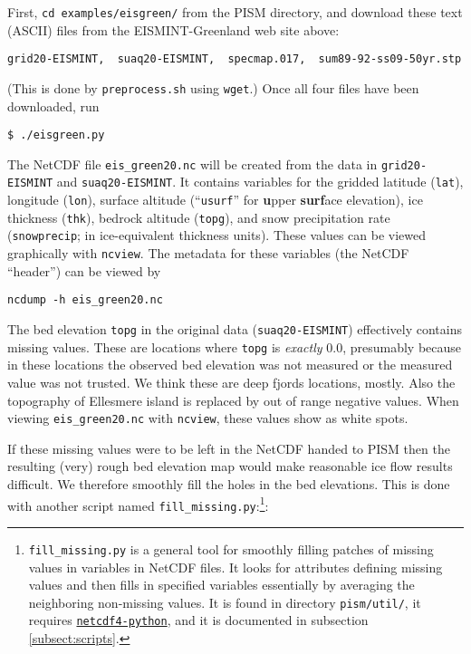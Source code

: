 First, \texttt{cd examples/eisgreen/} from the PISM directory, and download these text (ASCII) files from the EISMINT-Greenland web site above: 

\begin{verbatim}
grid20-EISMINT,  suaq20-EISMINT,  specmap.017,  sum89-92-ss09-50yr.stp
\end{verbatim}

\noindent (This is done by \texttt{preprocess.sh} using \texttt{wget}.) Once all four files have been downloaded, run

\begin{verbatim}
$ ./eisgreen.py
\end{verbatim}%

\noindent The NetCDF file \texttt{eis_green20.nc} will be created from the data in \texttt{grid20-EISMINT} and \texttt{suaq20-EISMINT}.  It contains variables for the gridded latitude (\texttt{lat}), longitude (\texttt{lon}), surface altitude (``\texttt{usurf}'' for \textbf{u}pper \textbf{surf}ace elevation), ice thickness (\texttt{thk}), bedrock altitude (\texttt{topg}), and snow precipitation rate (\texttt{snowprecip}; in ice-equivalent thickness units).  These values can be viewed graphically with \texttt{ncview}.  The metadata for these variables (the NetCDF ``header'') can be viewed by

\begin{verbatim}
ncdump -h eis_green20.nc
\end{verbatim}

The bed elevation \texttt{topg} in the original data (\texttt{suaq20-EISMINT}) effectively contains missing values.  These are locations where \texttt{topg} is \emph{exactly} $0.0$, presumably because in these locations the observed bed elevation was not measured or the measured value was not trusted.  We think these are deep fjords locations, mostly.  Also the topography of Ellesmere island is replaced by out of range negative values.  When viewing \texttt{eis_green20.nc} with \texttt{ncview}, these values show as white spots.  

If these missing values were to be left in the NetCDF handed to PISM then the resulting (very) rough bed elevation map would make reasonable ice flow results difficult.  We therefore smoothly fill the holes in the bed elevations.  This is done with another script named \texttt{fill_missing.py}:\footnote{\texttt{fill_missing.py} is a general tool for smoothly filling patches of missing values in variables in NetCDF files.  It looks for attributes defining missing values and then fills in specified variables essentially by averaging the neighboring non-missing values.  It is found in directory \texttt{pism/util/}, it requires \href{http://code.google.com/p/netcdf4-python/}{\texttt{netcdf4-python}}, and it is documented in subsection \ref{subsect:scripts}.}:

